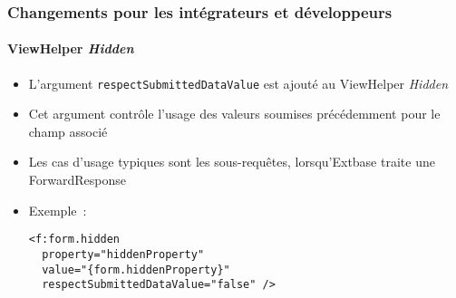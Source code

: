 %

\begin{frame}[fragile]
	\frametitle{Changements pour les intégrateurs et développeurs}
	\framesubtitle{ViewHelper \textit{Hidden}}


	\begin{itemize}
		\item L'argument \texttt{respectSubmittedDataValue} est ajouté
			au ViewHelper \textit{Hidden}
		\item Cet argument contrôle l'usage des valeurs soumises précédemment pour
			le champ associé
		\item Les cas d'usage typiques sont les sous-requêtes, lorsqu'Extbase traite une
			ForwardResponse

		\item Exemple~:
\begin{lstlisting}
<f:form.hidden
  property="hiddenProperty"
  value="{form.hiddenProperty}"
  respectSubmittedDataValue="false" />
\end{lstlisting}

	\end{itemize}
\end{frame}

